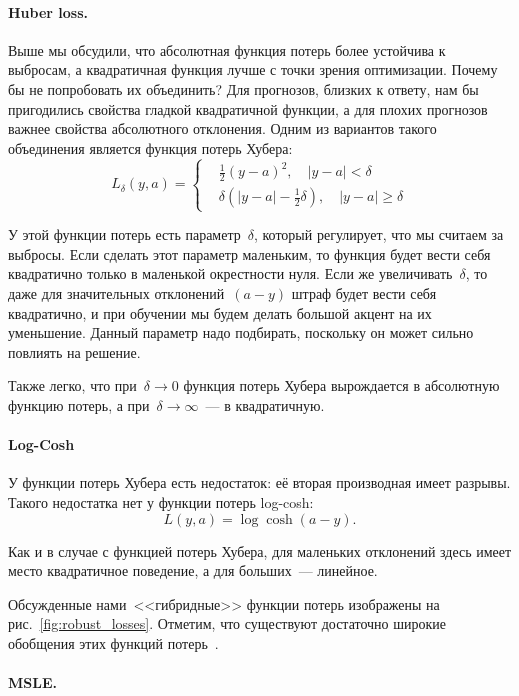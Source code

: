 \documentclass[12pt,fleqn]{article}
\begin{document}
\paragraph{Huber loss.}

Выше мы обсудили, что абсолютная функция потерь более устойчива к выбросам,
а квадратичная функция лучше с точки зрения оптимизации.
Почему бы не попробовать их объединить?
Для прогнозов, близких к ответу, нам бы пригодились свойства гладкой квадратичной функции,
а для плохих прогнозов важнее свойства абсолютного отклонения.
Одним из вариантов такого объединения является функция потерь Хубера:
\[
    L_\delta(y, a)
    =
    \left\{
    \begin{aligned}
        &\frac12 (y - a)^2, \quad |y - a| < \delta \\
        &\delta \left(
            |y - a| - \frac12 \delta
        \right), \quad |y - a| \geq \delta
    \end{aligned}
    \right.
\]

У этой функции потерь есть параметр~$\delta$, который регулирует, что мы считаем за выбросы.
Если сделать этот параметр маленьким, то функция будет вести себя квадратично только в маленькой окрестности нуля.
Если же увеличивать~$\delta$, то даже для значительных отклонений~$(a - y)$ штраф будет вести себя квадратично,
и при обучении мы будем делать большой акцент на их уменьшение.
Данный параметр надо подбирать, поскольку он может сильно повлиять на решение.

Также легко, что при~$\delta \to 0$ функция потерь Хубера вырождается в абсолютную функцию потерь,
а при~$\delta \to \infty$~--- в квадратичную.

\paragraph{Log-Cosh}

У функции потерь Хубера есть недостаток: её вторая производная имеет разрывы.
Такого недостатка нет у функции потерь log-cosh:
\[
    L(y, a)
    =
    \log \cosh(a - y).
\]

Как и в случае с функцией потерь Хубера, для маленьких отклонений здесь имеет место
квадратичное поведение, а для больших~--- линейное.

Обсужденные нами~<<гибридные>> функции потерь изображены на рис.~\ref{fig:robust_losses}.
Отметим, что существуют достаточно широкие обобщения этих функций потерь~\cite{barron19robust}.

\paragraph{MSLE.}
\end{document}
